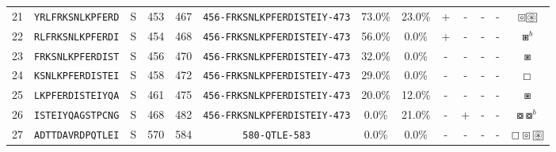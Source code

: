 \begin{tabular}{rcccccccccccc}
21 &  \texttt{YRLFRKSNLKPFERD} &       S &    453 &   467 &  \texttt{{\scriptsize 456-}FRKSNLKPFERDISTEIY{\scriptsize -473}} &                          73.0\% &                           23.0\% &          + &           - &          - &           - &                                        $ \boxcircle \setlength{\fboxsep}{0.5pt} \boxed{\circledast} $ \\
22 &  \texttt{RLFRKSNLKPFERDI} &       S &    454 &   468 &  \texttt{{\scriptsize 456-}FRKSNLKPFERDISTEIY{\scriptsize -473}} &                          56.0\% &                            0.0\% &          + &           - &          - &           - &                                                                                         $ \boxast^b $ \\
23 &  \texttt{FRKSNLKPFERDIST} &       S &    456 &   470 &  \texttt{{\scriptsize 456-}FRKSNLKPFERDISTEIY{\scriptsize -473}} &                          32.0\% &                            0.0\% &          - &           - &          - &           - &                                                                                           $ \boxast $ \\
24 &  \texttt{KSNLKPFERDISTEI} &       S &    458 &   472 &  \texttt{{\scriptsize 456-}FRKSNLKPFERDISTEIY{\scriptsize -473}} &                          29.0\% &                            0.0\% &          - &           - &          - &           - &                                                                                         $ \boxempty $ \\
25 &  \texttt{LKPFERDISTEIYQA} &       S &    461 &   475 &  \texttt{{\scriptsize 456-}FRKSNLKPFERDISTEIY{\scriptsize -473}} &                          20.0\% &                           12.0\% &          - &           - &          - &           - &                                                                                           $ \boxast $ \\
26 &  \texttt{ISTEIYQAGSTPCNG} &       S &    468 &   482 &  \texttt{{\scriptsize 456-}FRKSNLKPFERDISTEIY{\scriptsize -473}} &                           0.0\% &                           21.0\% &          - &           + &          - &           - &                                                                           $ \boxcircle \boxcircle^b $ \\
27 &  \texttt{ADTTDAVRDPQTLEI} &       S &    570 &   584 &                \texttt{{\scriptsize 580-}QTLE{\scriptsize -583}} &                           0.0\% &                            0.0\% &          - &           - &          - &           - &                              $ \boxempty \boxcircle \setlength{\fboxsep}{0.5pt} \boxed{\circledast} $ \\

\end{tabular}
